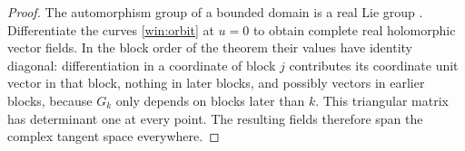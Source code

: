 \begin{proof}
The automorphism group of a bounded domain is a real Lie group
\cite[Proposition~3.1 and Theorem~6.2]{Kobayashi1967}.
Differentiate the curves \eqref{win:orbit} at $u=0$ to obtain
complete real holomorphic vector fields.  In the block order of
the theorem their values have identity diagonal: differentiation
in a coordinate of block $j$ contributes its coordinate unit
vector in that block, nothing in later blocks, and possibly
vectors in earlier blocks, because $G_k$ only depends on blocks
later than $k$.  This triangular matrix has determinant one at
every point.  The resulting fields therefore span the complex
tangent space everywhere.
\end{proof}
